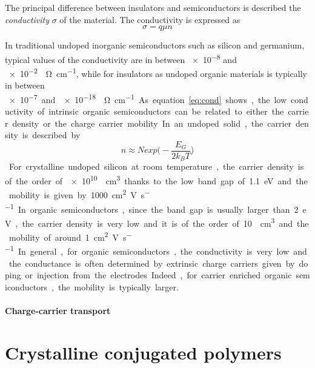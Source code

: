\documentclass  [
  paper    = a4,
  BCOR     = 10mm,
  twoside,
  fontsize = 12pt,
  fleqn,
  toc      = bibnumbered,
  toc      = listofnumbered,
  numbers  = noendperiod,
  headings = normal,
  listof   = leveldown,
  version  = 3.03
]                                       {scrreprt}
\begin{document}
The principal difference between insulators and semiconductors is described the \emph{conductivity} $\sigma$ of the material. The conductivity is expressed as
\begin{equation}
\sigma = q \mu n
\label{eq:cond}
\end{equation}


In traditional undoped inorganic semiconductors such as silicon and germanium, typical values of the conductivity are in between \SI{e-8}{} and \SI{e-2}{\per\ohm\per\centi\meter}, while for insulators as undoped organic materials is typically in between \SI{e-7} and \SI{e-18}{\per\ohm\per\centi\meter}. As equation \ref{eq:cond} shows, the low conductivity of intrinsic organic semiconductors can be related to either the carrier density or the charge carrier mobility. In an undoped solid, the carrier density is described by
\begin{equation}
n \approx Nexp\Big(-\frac{E_G}{2k_BT}\Big)
\label{eq:density}
\end{equation}
For crystalline undoped silicon at room temperature, the carrier density is of the order of \SI{e10}{\per\centi\meter\cubed} thanks to the low band gap of \SI{1.1}{\electronvolt} and the mobility is given by \SI{1000}{\centi\meter\squared\per\volt\per\second}. In organic semiconductors, since the band gap is usually larger than \SI{2}{\electronvolt}, the carrier density is very low and it is of the order of \SI{10}{\per\centi\meter\cubed} and the mobility of around \SI{1}{\centi\meter\squared\per\volt\per\second}. In general, for organic semiconductors, the conductivity is very low and the conductance is often determined by extrinsic charge carriers given by doping or injection from the electrodes. Indeed, for carrier enriched organic semiconductors, the mobility is typically larger. 

\paragraph{Charge-carrier transport} 


	\section{Crystalline conjugated polymers}
\end{document}
